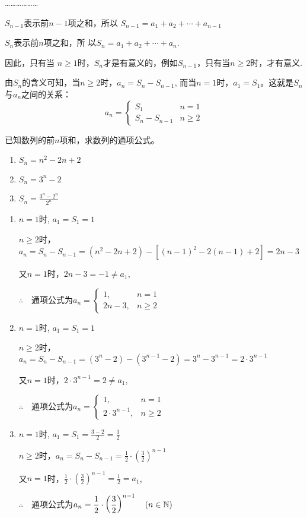 ………………

$S_{n-1}$表示前$n-1$项之和，所以
$S_{n-1}=a_1+a_2+\cdots+a_{n-1}$

$S_n$表示前$n$项之和，所
以$S_n=a_1+a_2+\cdots+a_n$.

因此，只有当
$n\ge 1$时，$S_n$才是有意义的，例如$S_{n-1}$，只有当$n\ge 2$时，才有意义.

由$S_n$的含义可知，当$n\geqslant2$时，$a_n=S_n-S_{n-1}$, 而当$n=1$时，$a_1=S_1$。这就是$S_n$与$a_n$之间的关系：
$$a_n=\begin{cases}
    S_1& n=1\\
    S_n-S_{n-1} &n\geqslant2 
\end{cases}$$

\begin{example}
    已知数列的前$n$项和，求数列的通项公式。
\begin{multicols}{3}
\begin{enumerate}[(1)]
    \item $S_{n}= n^2- 2n+ 2$
    \item $S_{n}= 3^{n}- 2$
    \item $S_{n}=\frac{3^{n}-2^{n}}{2^{n}}$
\end{enumerate}    
\end{multicols}
\end{example}

\begin{solution}
\begin{enumerate}[(1)]
    \item $n= 1$时, $a_{1}= S_{1}= 1$
    
    $n\geqslant2$时，$a_{n}=S_{n}-S_{n-1}=(n^2-2n+2)-[(n-1)^2-2(n-1)+2]=2n-3$

又$n=1$时，$2n-3=-1\ne a_1$,

$\therefore\quad $通项公式为$a_n=\begin{cases}
    1,&n=1\\
    2n-3,&n\ge 2
\end{cases}$

\item $n= 1$时, $a_{1}= S_{1}= 1$
    
$n\geqslant2$时，$a_{n}=S_{n}-S_{n-1}=(3^n-2)-(3^{n-1}-2)=3^{n}-3^{n-1}=2\cdot 3^{n-1}$

又$n=1$时，$2\cdot 3^{n-1}=2\ne a_1$,

$\therefore\quad $通项公式为$a_n=\begin{cases}
1,&n=1\\
2\cdot 3^{n-1},&n\ge 2
\end{cases}$

\item $n= 1$时, $a_{1}= S_{1}= \frac{3-2}{2}=\frac{1}{2}$
    
$n\geqslant2$时，$a_{n}=S_{n}-S_{n-1}=\frac{1}{2}\cdot\left(\frac{3}{2}\right)^{n-1}$

又$n=1$时，$\frac{1}{2}\cdot\left(\frac{3}{2}\right)^{n-1}=\frac{1}{2}= a_1$,

$\therefore\quad $通项公式为$a_n=\dfrac{1}{2}\cdot\left(\dfrac{3}{2}\right)^{n-1}\quad (n\in\mathbb{N})$
\end{enumerate}
\end{solution}


